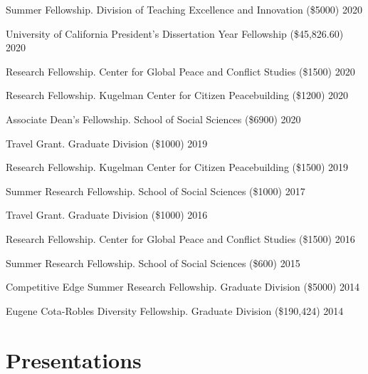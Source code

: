 \documentclass[10pt,]{article}
\renewenvironment{itemize}{
  \begin{list}{}{
    \setlength{\leftmargin}{1.5em}
  }
}{
  \end{list}
}
\begin{document}
\begin{itemize}
\item
  Summer Fellowship. Division of Teaching Excellence and Innovation
  (\$5000) \hfill 2020
\item
  University of California President's Dissertation Year Fellowship
  (\$45,826.60) \hfill 2020
\item
  Research Fellowship. Center for Global Peace and Conflict Studies
  (\$1500) \hfill 2020
\item
  Research Fellowship. Kugelman Center for Citizen Peacebuilding
  (\$1200) \hfill 2020
\item
  Associate Dean's Fellowship. School of Social Sciences (\$6900)
  \hfill 2020
\item
  Travel Grant. Graduate Division (\$1000) \hfill 2019
\item
  Research Fellowship. Kugelman Center for Citizen Peacebuilding
  (\$1500) \hfill 2019
\item
  Summer Research Fellowship. School of Social Sciences (\$1000)
  \hfill 2017
\item
  Travel Grant. Graduate Division (\$1000) \hfill 2016
\item
  Research Fellowship. Center for Global Peace and Conflict Studies
  (\$1500) \hfill 2016
\item
  Summer Research Fellowship. School of Social Sciences (\$600)
  \hfill 2015
\item
  Competitive Edge Summer Research Fellowship. Graduate Division
  (\$5000) \hfill 2014
\item
  Eugene Cota-Robles Diversity Fellowship. Graduate Division (\$190,424)
  \hfill 2014
\end{itemize}

\hypertarget{presentations}{%
\section{Presentations}\label{presentations}}
\end{document}
